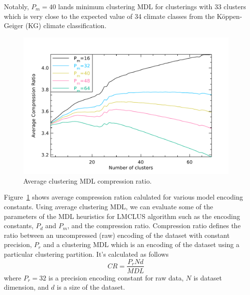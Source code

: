 Notably, $P_m = 40$ lands minimum clustering MDL for clusterings with
33 clusters which is very close to the expected value of 34 climate classes from
the K{\"o}ppen-Geiger (KG) climate classification.

\begin{figure}[H]
\center
\includegraphics[width=5.0in]{img/mdl-clust_clustering-mdl-cr_1.pdf}
\caption{Average clustering MDL compression ratio.}
\label{fig:clustering-mdl-cr}
\end{figure}



Figure~\ref{fig:clustering-mdl-cr} shows average compression ration calulated
for various model encoding constants.
Using average clustering MDL, we can evaluate some of the parameters of
the MDL heuristics for LMCLUS algorithm such as the encoding constants,
$P_d$ and $P_m$, and the compression ratio. Compression ratio defines the ratio
between an uncompressed (raw) encoding of the dataset with constant precision,
$P_r$ and a clustering MDL  which is an encoding of the dataset using
a particular clustering partition. It's calculated as follows
$$CR = \frac{P_rNd}{MDL}$$
where $P_r = 32$ is a precision encoding constant for raw data, $N$ is dataset dimension, and $d$ is a size of the dataset.
